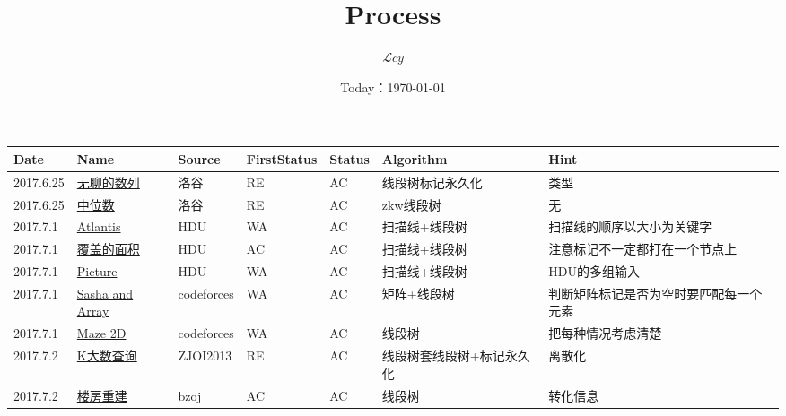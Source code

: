 \documentclass[a4paper]{article}
\date{Today：\today}
\title{Process}
\author{{$\mathcal Lcy$}}
\newcommand{\song}{\CJKfamily{song}}
\begin{document}
	
	\maketitle
	
	\song
	
	\begin{longtable}{|p{1.5cm}|p{2.5cm}|p{1.6cm}|p{1.6cm}|p{1cm}|p{3cm}|p{4cm}|}
		
		\hline
		Date & Name & Source & FirstStatus & Status & Algorithm & Hint\\
		
		\hline
		2017.6.25 & \href {https://www.luogu.org/problem/show?pid=1438}{无聊的数列}
		 & 洛谷 & RE & AC & 线段树标记永久化 & 类型\\
		
		\hline
		2017.6.25 & \href {https://www.luogu.org/problem/show?pid=1168}{中位数}
		 & 洛谷 & RE & AC & zkw线段树 & 无\\
		
		\hline
		2017.7.1 & \href {https://vjudge.net/problem/HDU-1542}{Atlantis}
		 & HDU & WA & AC & 扫描线+线段树 & 扫描线的顺序以大小为关键字\\
		
		\hline
		2017.7.1 & \href {https://vjudge.net/problem/HDU-1255}{覆盖的面积}
		 & HDU & AC & AC & 扫描线+线段树 & 注意标记不一定都打在一个节点上\\
		
		\hline
		2017.7.1 & \href {https://vjudge.net/problem/HDU-1828}{Picture}
		 & HDU & WA & AC & 扫描线+线段树 & HDU的多组输入\\
		
		\hline
		2017.7.1 & \href {http://codeforces.com/problemset/problem/718/C}{Sasha and Array}
		 & codeforces & WA & AC & 矩阵+线段树 & 判断矩阵标记是否为空时要匹配每一个元素\\
		
		\hline
		2017.7.1 & \href {http://codeforces.com/problemset/problem/413/E}{Maze 2D}
		 & codeforces & WA & AC & 线段树 & 把每种情况考虑清楚\\
		
		\hline
		2017.7.2 & \href {http://www.lydsy.com/JudgeOnline/problem.php?id=3110}{K大数查询}
		 & ZJOI2013 & RE & AC & 线段树套线段树+标记永久化 & 离散化\\
		
		\hline
		2017.7.2 & \href {http://www.lydsy.com/JudgeOnline/problem.php?id=2957}{楼房重建}
		 & bzoj & AC & AC & 线段树 & 转化信息\\
		

\end{longtable}
\end{document}
